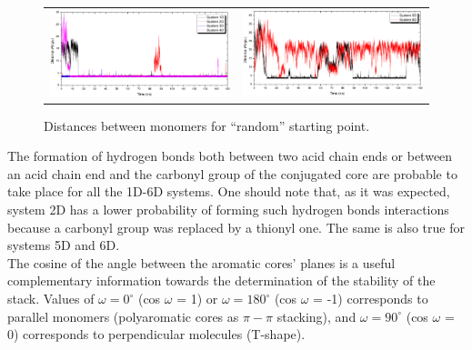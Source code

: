 \begin{figure}[htb]
	\centering
	\begin{tabular}{cc}
		\includegraphics[width=0.45\columnwidth]{image/distance_1-4}&
		\includegraphics[width=0.45\columnwidth]{image/distance_5-6} \\
	\end{tabular}
	\caption{Distances between monomers for ``random'' starting point.}
	\label{pap:fig08}
\end{figure}

The formation of hydrogen bonds both between two acid chain ends or between an acid chain end and the carbonyl group of the conjugated core are probable to take place for all the 1D-6D systems. One should note that, as it was expected, system 2D has a lower probability of forming such hydrogen bonds interactions because a carbonyl group was replaced by a thionyl one. The same is also true for systems 5D and 6D.\\

The cosine of the angle between the aromatic cores' planes is a useful complementary information towards the determination of the stability of the stack. Values of $\omega = 0^\circ$  (cos $\omega$  = 1) or  $\omega = 180^\circ$ (cos $\omega$ = -1) corresponds to parallel monomers (polyaromatic cores as $\pi-\pi$ stacking), and  $\omega = 90^\circ$ (cos $\omega$ = 0) corresponds to perpendicular molecules (T-shape).\\  

